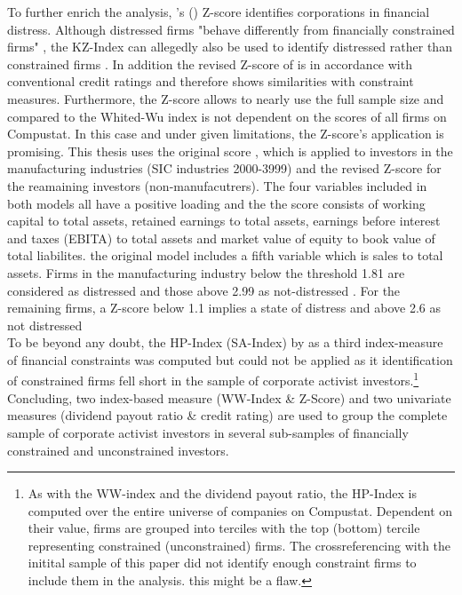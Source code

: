 \documentclass[12pt]{article}
\begin{document}
To further enrich the analysis, \citeauthor{Altman1968}'s (\citeyear{Altman1968}) Z-score identifies corporations in financial distress. Although distressed firms "behave differently from financially constrained firms" \citep[p.461]{Bhagat2005}, the KZ-Index can allegedly also be used to identify distressed rather than constrained firms \citep[p.47]{Kim2015}. In addition the revised Z-score of \citet[p.19]{Altman2002} is in accordance with conventional credit ratings and therefore shows similarities with constraint measures. Furthermore, the Z-score allows to nearly use the full sample size and compared to the Whited-Wu index is not dependent on the scores of all firms on Compustat. In this case and under given limitations, the Z-score's application is promising. This thesis uses the original score \citep[p.607]{Altman1968}, which is applied to investors in the manufacturing industries (SIC industries 2000-3999) and the revised Z-score \citep[p.17]{Altman2002} for the reamaining investors (non-manufacutrers). The four variables included in both models all have a positive loading and the the score consists of working capital to total assets, retained earnings to total assets, earnings before interest and taxes (EBITA) to total assets and market value of equity to book value of total liabilites. the original model includes a fifth variable which is sales to total assets. Firms in the manufacturing industry below the threshold 1.81 are considered as distressed and those above 2.99 as not-distressed \citep[p.14]{Altman2002}. For the remaining firms, a Z-score below 1.1 implies a state of distress and above 2.6 as not distressed \citep[p.175]{Sulub2014}\\
To be beyond any doubt, the HP-Index (SA-Index) by \citet{hadlock2010} as a third index-measure of financial constraints was computed but could not be applied as it identification of constrained firms fell short in the sample of corporate activist investors.\footnote{As with the WW-index and the dividend payout ratio, the HP-Index is computed over the entire universe of companies on Compustat. Dependent on their value, firms are grouped into terciles with the top (bottom) tercile representing constrained (unconstrained) firms. The crossreferencing with the initital sample of this paper did not identify enough constraint firms to include them in the analysis. this might be a flaw.} Concluding, two index-based measure (WW-Index \& Z-Score) and two univariate measures (dividend payout ratio \& credit rating) are used to group the complete sample of corporate activist investors in several sub-samples of financially constrained and unconstrained investors.
\end{document}
